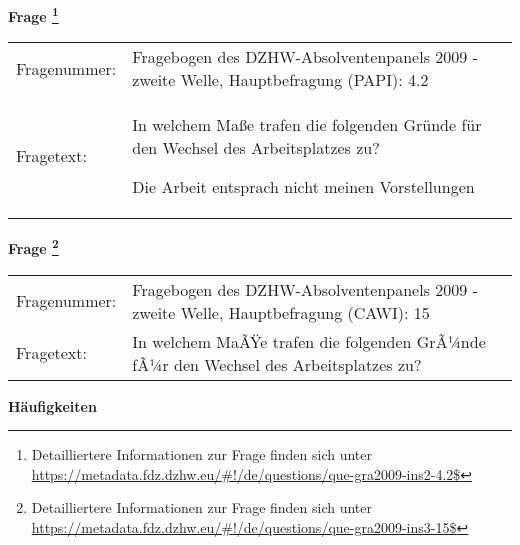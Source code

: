 				\vspace*{0.5cm}
                \noindent\textbf{Frage
	                \footnote{Detailliertere Informationen zur Frage finden sich unter
		              \url{https://metadata.fdz.dzhw.eu/\#!/de/questions/que-gra2009-ins2-4.2$}}}\\
				\begin{tabularx}{\hsize}{@{}lX}
					Fragenummer: &
					  Fragebogen des DZHW-Absolventenpanels 2009 - zweite Welle, Hauptbefragung (PAPI):
					  4.2
 \\
					Fragetext: & In welchem Maße trafen die folgenden Gründe für den Wechsel des Arbeitsplatzes zu?\par  Die Arbeit entsprach nicht meinen Vorstellungen \\
				\end{tabularx}
				\vspace*{0.5cm}
                \noindent\textbf{Frage
	                \footnote{Detailliertere Informationen zur Frage finden sich unter
		              \url{https://metadata.fdz.dzhw.eu/\#!/de/questions/que-gra2009-ins3-15$}}}\\
				\begin{tabularx}{\hsize}{@{}lX}
					Fragenummer: &
					  Fragebogen des DZHW-Absolventenpanels 2009 - zweite Welle, Hauptbefragung (CAWI):
					  15
 \\
					Fragetext: & In welchem MaÃŸe trafen die folgenden GrÃ¼nde fÃ¼r den Wechsel des Arbeitsplatzes zu? \\
				\end{tabularx}





        		\vspace*{0.5cm}
                \noindent\textbf{Häufigkeiten}

